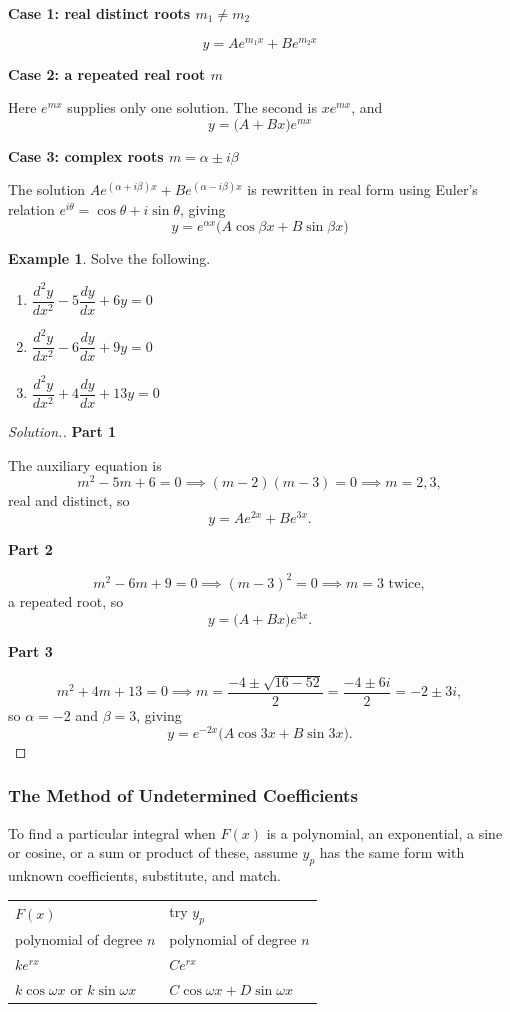 \documentclass[11pt,a4paper]{article}
\theoremstyle{definition}
\newtheorem{exa}[thm]{Example}
\newenvironment{solution}
  {\renewcommand{\qedsymbol}{}\begin{proof}[\textit{Solution}.]}
  {\end{proof}}
\newcommand{\subhead}[1]{%
  \par\medskip\noindent\textbf{#1}\par\nobreak\smallskip}
\begin{document}
\subhead{Case 1: real distinct roots $m_1 \neq m_2$}
$$y = Ae^{m_1x} + Be^{m_2x}$$

\subhead{Case 2: a repeated real root $m$}
Here $e^{mx}$ supplies only one solution. The second is $xe^{mx}$, and
$$y = \big(A + Bx\big)e^{mx}$$

\subhead{Case 3: complex roots $m = \alpha \pm i\beta$}
The solution $Ae^{(\alpha+i\beta)x} + Be^{(\alpha-i\beta)x}$ is rewritten in real
form using Euler's relation $e^{i\theta} = \cos\theta + i\sin\theta$, giving
$$y = e^{\alpha x}\big(A\cos\beta x + B\sin\beta x\big)$$

\begin{exa}
Solve the following.
\begin{enumerate}
\item $\dfrac{d^2y}{dx^2} - 5\dfrac{dy}{dx} + 6y = 0$
\item $\dfrac{d^2y}{dx^2} - 6\dfrac{dy}{dx} + 9y = 0$
\item $\dfrac{d^2y}{dx^2} + 4\dfrac{dy}{dx} + 13y = 0$
\end{enumerate}
\end{exa}

\begin{solution}
\subhead{Part 1}
The auxiliary equation is
$$m^2 - 5m + 6 = 0 \implies (m-2)(m-3) = 0 \implies m = 2, 3 ,$$
real and distinct, so
$$y = Ae^{2x} + Be^{3x}.$$

\subhead{Part 2}
$$m^2 - 6m + 9 = 0 \implies (m-3)^2 = 0 \implies m = 3 \text{ twice},$$
a repeated root, so
$$y = \big(A + Bx\big)e^{3x}.$$

\subhead{Part 3}
$$m^2 + 4m + 13 = 0 \implies
m = \frac{-4 \pm \sqrt{16 - 52}}{2} = \frac{-4 \pm 6i}{2} = -2 \pm 3i ,$$
so $\alpha = -2$ and $\beta = 3$, giving
$$y = e^{-2x}\big(A\cos 3x + B\sin 3x\big).$$
\end{solution}

\subsubsection{The Method of Undetermined Coefficients}

To find a particular integral when $F(x)$ is a polynomial, an exponential, a
sine or cosine, or a sum or product of these, assume $y_p$ has the same form
with unknown coefficients, substitute, and match.

\begin{center}
\begin{tabular}{ll}
$F(x)$ & try $y_p$\\[2pt]
polynomial of degree $n$ & polynomial of degree $n$\\
$ke^{rx}$ & $Ce^{rx}$\\
$k\cos\omega x$ or $k\sin\omega x$ & $C\cos\omega x + D\sin\omega x$\\
\end{tabular}
\end{center}
\end{document}
